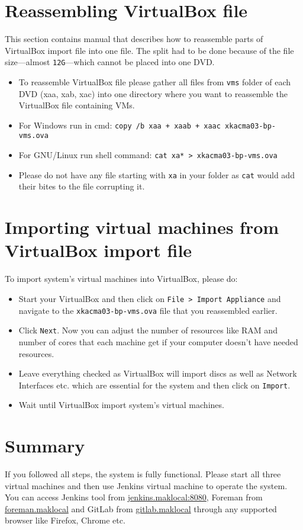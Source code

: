 \section{Reassembling VirtualBox file}
This section contains manual that describes how to reassemble parts of VirtualBox import file into one file. The split had to be done because of the file size---almost \texttt{12G}---which cannot be placed into one DVD.
\begin{itemize}
	\item To reassemble VirtualBox file please gather all files from \texttt{vms} folder of each DVD (xaa, xab, xac) into one directory where you want to reassemble the VirtualBox file containing VMs.
	\item For Windows run in cmd: \texttt{copy /b xaa + xaab + xaac xkacma03-bp-vms.ova}
	\item For GNU/Linux run shell command: \texttt{cat xa* > xkacma03-bp-vms.ova}
	\item Please do not have any file starting with \texttt{xa} in your folder as \texttt{cat} would add their bites to the file corrupting it.
\end{itemize}
\section{Importing virtual machines from VirtualBox import file}
To import system's virtual machines into VirtualBox, please do:
\begin{itemize}
\item Start your VirtualBox and then click on \texttt{File > Import Appliance} and navigate to the \texttt{xkacma03-bp-vms.ova} file that you reassembled earlier. 
\item Click \texttt{Next}. Now you can adjust the number of resources like RAM and number of cores that each machine get if your computer doesn't have needed resources.
\item Leave everything checked as VirtualBox will import discs as well as Network Interfaces etc. which are essential for the system and then click on \texttt{Import}.
\item Wait until VirtualBox import system's virtual machines.
\end{itemize}
\section{Summary}
If you followed all steps, the system is fully functional. Please start all three virtual machines and then use Jenkins virtual machine to operate the system. You can access Jenkins tool from \url{jenkins.maklocal:8080}, Foreman from \url{foreman.maklocal} and GitLab from \url{gitlab.maklocal} through any supported browser like Firefox, Chrome etc. 
